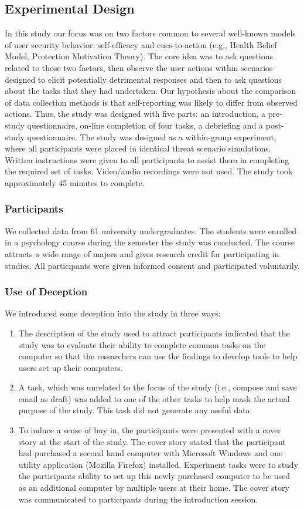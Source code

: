 \documentclass[doctor]{thesis} %
\theoremstyle{plain}
\begin{document}
\subsection*{Experimental Design}
In this study our focus was on two factors common to several well-known models of user security behavior: self-efficacy and cues-to-action (e.g., Health Belief Model, Protection Motivation Theory). The core idea was to ask questions related to those two factors, then observe the user actions within scenarios designed to elicit potentially detrimental responses and then to ask questions about the tasks that they had undertaken. Our hypothesis about the comparison of data collection methods is that self-reporting was likely to differ from observed actions. Thus, the study was designed with five parts: an introduction, a pre-study questionnaire, on-line completion of four tasks, a debriefing and a post-study questionnaire. The study was designed as a within-group experiment, where all participants were placed in identical threat scenario simulations. Written instructions were given to all participants to assist them in completing the required set of tasks. Video/audio recordings were not used. The study took approximately 45 minutes to complete.

\subsubsection*{Participants}
We collected data from 61 university undergraduates. The students were enrolled in a psychology course during the semester the study was conducted. The course attracts a wide range of majors and gives research credit for participating in studies. All participants were given informed consent and participated voluntarily.


\subsubsection*{Use of Deception}
We introduced some deception into the study in three ways:
\begin{enumerate}
\item The description of the study used to attract participants indicated that the study was to evaluate their ability to complete common tasks on the computer so that the researchers can
use the findings to develop tools to help users set up their computers.
\item A task, which was unrelated to the focus of the study (i.e., compose and save email as draft)
was added to one of the other tasks to help mask the actual purpose of the study. This task
did not generate any useful data.
\item To induce a sense of buy in, the participants were presented with a cover story at the start of
the study. The cover story stated that the participant had purchased a second hand computer
with Microsoft Windows and one utility application (Mozilla Firefox) installed. Experiment tasks were to study the participants ability to set up this newly purchased computer to be used as an additional computer by multiple users at their home. The cover story was
communicated to participants during the introduction session.
\end{enumerate}
\end{document}
